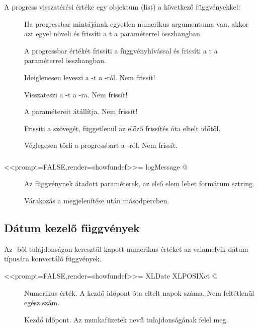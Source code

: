 A progress visszatérési értéke egy objektum (list) a következő függvényekkel:
\begin{description}
\item[] Ha progressbar mintájának egyetlen numerikus
  argumentuma van, akkor azt egyel növeli és frissíti a
  t a  paraméterrel összhangban. 
\item[] A progressbar értékét frissíti a
   függvényhívással és frissíti a
  t a  paraméterrel összhangban. 
\item[] Ideiglenesen leveszi a -t a
  -ról. Nem frissít! 
\item[] Visszateszi a -t a
  -ra. Nem frissít! 
\item[] A  paramétereit
  átállítja. Nem frissít! 
\item[] Frissíti a  szövegét, függetlenül az
előző frissítés óta eltelt időtől. 
\item[] Véglegesen törli a progressbart a -ról. Nem frissít.
\end{description}


\subsubsection{}

\begin{Rnw}
<<prompt=FALSE,render=showfundef>>=
logMessage
@
\end{Rnw}
%
\begin{description}
\item[] Az  függvénynek átadott paraméterek,
  az első elem lehet formátum sztring. 
\item[] Várakozás a  megjelenítése után másodpercben.
\end{description}

\subsection{Dátum kezelő függvények}
Az -ből  tulajdonságon keresztül kapott numerikus
értéket az  valamelyik dátum 
típusára konvertáló függvények.
\begin{Rnw}
<<prompt=FALSE,render=showfundef>>=
XLDate
XLPOSIXct
@
\end{Rnw}
\begin{description}
\item[] Numerikus érték. A kezdő időpont óta eltelt napok
  száma. Nem feltétlenül egész szám. 
\item[] Kezdő időpont. Az  munkafüzetek
   nevű 
  tulajdonságának felel meg. 
\end{description}

